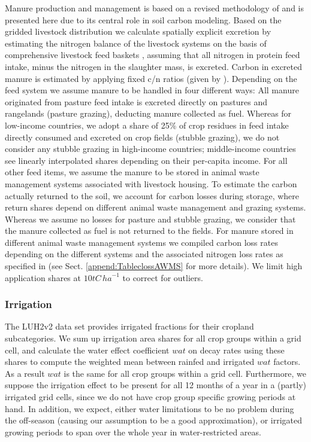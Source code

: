\documentclass[gc, manuscript]{copernicus}
\begin{document}
Manure production and management is based on a revised methodology of \citep{bodirsky_n2o_2012} and is presented here due to its central role in soil carbon modeling. Based on the gridded livestock distribution we calculate spatially explicit excretion by estimating the nitrogen balance of the livestock systems on the basis of comprehensive livestock feed baskets \citep{weindl_livestock_2017}, assuming that all nitrogen in protein feed intake, minus the nitrogen in the slaughter mass, is excreted. Carbon in excreted manure is estimated by applying fixed c/n ratios (given by \citep{calvo_buendia_ipcc_2019}).
Depending on the feed system we assume manure to be handled in four different ways:
All manure originated from pasture feed intake is excreted directly on pastures and rangelands (pasture grazing), deducting manure collected as fuel.
Whereas for low-income countries, we adopt a share of 25\% of crop residues in feed intake directly consumed and excreted on crop fields (stubble grazing), we do not consider any stubble grazing in high-income countries; middle-income countries see linearly interpolated shares depending on their per-capita income.
For all other feed items, we assume the manure to be stored in animal waste management systems associated with livestock housing.
To estimate the carbon actually returned to the soil, we account for carbon losses during storage, where return shares depend on different animal waste management and grazing systems. Whereas we assume no losses for pasture and stubble grazing, we consider that the manure collected as fuel is not returned to the fields. For manure stored in different animal waste management systems we compiled carbon loss rates depending on the different systems and the associated nitrogen loss rates as specified in \citep{bodirsky_n2o_2012} (see Sect. \ref{append:TableclossAWMS} for more details). We limit high application shares at \(10\unit{tC\,ha}^{-1}\) to correct for outliers.

\hypertarget{sec:irrigation}{%
\subsubsection{Irrigation}\label{sec:irrigation}}

The LUH2v2 \citep{hurtt_harmonization_2020} data set provides irrigated fractions for their cropland subcategories. We sum up irrigation area shares for all crop groups within a grid cell, and calculate the water effect coefficient \(wat\) on decay rates using these shares to compute the weighted mean between rainfed and irrigated \(wat\) factors. As a result \(wat\) is the same for all crop groups within a grid cell. Furthermore, we suppose the irrigation effect to be present for all 12 months of a year in a (partly) irrigated grid cells, since we do not have crop group specific growing periods at hand. In addition, we expect, either water limitations to be no problem during the off-season (causing our assumption to be a good approximation), or irrigated growing periods to span over the whole year in water-restricted areas.
\end{document}
